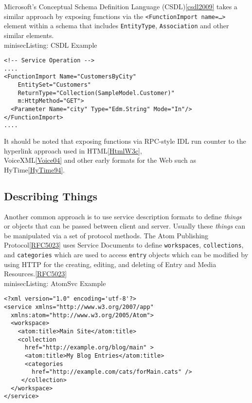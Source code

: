 \documentclass{wsrest2014}
\begin{document}
 \par{}Microsoft's Conceptual Schema Definition Language (CSDL)\hyperlink{csdl2009}{[csdl2009]} takes a similar approach by exposing functions via the \texttt{\textless{}FunctionImport name=\textquotedbl{}\dots{}\textquotedbl{}\textgreater{}} element within a schema that includes \texttt{EntityType}, \texttt{Association} and other similar elements.
\\minisec{Listing: CSDL Example}
\begin{verbatim}<!-- Service Operation -->
....
<FunctionImport Name="CustomersByCity"
    EntitySet="Customers"
    ReturnType="Collection(SampleModel.Customer)"
    m:HttpMethod="GET">
  <Parameter Name="city" Type="Edm.String" Mode="In"/>
</FunctionImport>
....\end{verbatim}

 \par{}It should be noted that exposing functions via RPC-style IDL run counter to the hyperlink approach used in HTML\hyperlink{HtmlW3c}{[HtmlW3c]},\\ VoiceXML\hyperlink{Voice04}{[Voice04]} and other early formats for the Web such as HyTime\hyperlink{HyTime94}{[HyTime94]}.
\hypertarget{_describing_things}{}
\subsection{Describing Things}
\label{_describing_things}
 \par{}Another common approach is to use service description formats to define \emph{things} or objects that can be passed between client and server. Usually these \emph{things} can be manipulated via a set of protocol methods. The Atom Publishing Protocol\hyperlink{RFC5023}{[RFC5023]} uses Service Documents to define \texttt{workspaces}, \texttt{collections}, and \texttt{categories} which are used to access \texttt{entry} objects which can be modified by using HTTP for \textquotedbl{}the creating, editing, and deleting of Entry and Media Resources.\textquotedbl{}\hyperlink{RFC5023}{[RFC5023]}
\\minisec{Listing: AtomSvc Example}
\begin{verbatim}<?xml version="1.0" encoding='utf-8'?>
<service xmlns="http://www.w3.org/2007/app"
  xmlns:atom="http://www.w3.org/2005/Atom">
  <workspace>
    <atom:title>Main Site</atom:title>
    <collection
      href="http://example.org/blog/main" >
      <atom:title>My Blog Entries</atom:title>
      <categories
        href="http://example.com/cats/forMain.cats" />
     </collection>
  </workspace>
</service>\end{verbatim}
\end{document}
